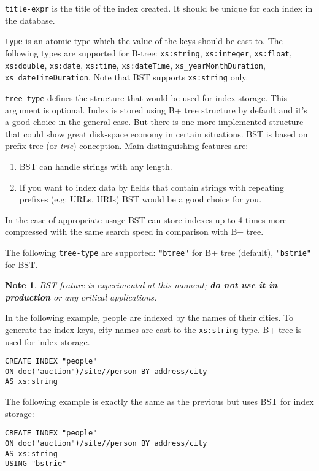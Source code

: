 \documentclass[a4paper,12pt]{article}
\newtheorem{note}{Note}    %
\begin{document}
\verb!title-expr! is the title of the index created. It should be unique for
each index in the database.

\verb!type! is an atomic type which the value of the keys should be cast to. The
following types are supported for B-tree: \verb!xs:string!, \verb!xs:integer!,
\verb!xs:float!, \verb!xs:double!, \verb!xs:date!, \verb!xs:time!,
\verb!xs:dateTime!, \verb!xs_yearMonthDuration!, \verb!xs_dateTimeDuration!.
Note that BST supports \verb!xs:string! only.

\verb!tree-type! defines the structure that would be used for index storage.
This argument is optional. Index is stored using B+ tree structure by default
and it's a good choice in the general case. But there is one more implemented
structure that could show great disk-space economy in certain situations. BST is
based on prefix tree (or \emph{trie}) conception. Main distinguishing features
are:
\begin{enumerate}
\item {BST can handle strings with any length.}
\item {If you want  to index data by fields that contain strings with repeating
prefixes (e.g: URLs, URIs) BST would be a good choice for you.}
\end{enumerate}
In the case of appropriate usage BST can store indexes up to 4 times more
compressed with the same search speed in comparison with B+ tree.

The following \verb!tree-type! are supported: \verb!"btree"! for B+ tree
(default), \verb!"bstrie"! for BST.

\begin{note} BST feature is experimental at this moment; \textbf{do not use it
in production} or any critical applications.
\end{note}

In the following example, people are indexed by the names of their cities. To
generate the index keys, city names are cast to the \verb!xs:string! type. B+
tree is used for index storage.

\begin{verbatim}
CREATE INDEX "people"
ON doc("auction")/site//person BY address/city
AS xs:string
\end{verbatim}

The following example is exactly the same as the previous but uses BST for index
storage:

\begin{verbatim}
CREATE INDEX "people"
ON doc("auction")/site//person BY address/city
AS xs:string
USING "bstrie"
\end{verbatim}
\end{document}
